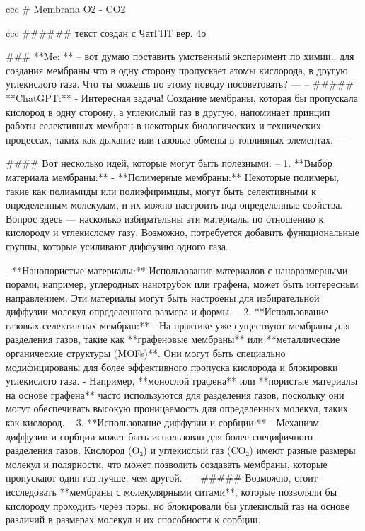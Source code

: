 ccc  #  Membrana O2 - CO2

ccc  ###### текст создан с ЧатГПТ вер. 4о

###  **Me: **  
-- вот думаю поставить умственный эксперимент по химии.. для создания мембраны что в одну сторону пропускает атомы кислорода, в другую углекислого газа. Что ты можешь по этому поводу посоветовать?
--- 
-- ##### **ChatGPT:**  
-  
Интересная задача! Создание мембраны, которая бы пропускала кислород в одну сторону, а углекислый газ в другую, напоминает принцип работы селективных мембран в некоторых биологических и технических процессах, таких как дыхание или газовые обмены в топливных элементах.
- 
-- 
 
#### Вот несколько идей, которые могут быть полезными:
-- 
1. **Выбор материала мембраны:**
   -  **Полимерные мембраны:** Некоторые полимеры, такие как полиамиды или полиэфиримиды, могут быть селективными к определенным молекулам, и их можно настроить под определенные свойства. Вопрос здесь — насколько избирательны эти материалы по отношению к кислороду и углекислому газу. Возможно, потребуется добавить функциональные группы, которые усиливают диффузию одного газа.
   
   -  **Нанопористые материалы:** Использование материалов с наноразмерными порами, например, углеродных нанотрубок или графена, может быть интересным направлением. Эти материалы могут быть настроены для избирательной диффузии молекул определенного размера и формы.
-- 
2. **Использование газовых селективных мембран:**
   - На практике уже существуют мембраны для разделения газов, такие как **графеновые мембраны** или **металлические органические структуры (MOFs)**. Они могут быть специально модифицированы для более эффективного пропуска кислорода и блокировки углекислого газа.
   - Например, **монослой графена** или **пористые материалы на основе графена** часто используются для разделения газов, поскольку они могут обеспечивать высокую проницаемость для определенных молекул, таких как кислород.
-- 
3. **Использование диффузии и сорбции:**
   -  Механизм диффузии и сорбции может быть использован для более специфичного разделения газов. Кислород (O₂) и углекислый газ (CO₂) имеют разные размеры молекул и полярности, что может позволить создавать мембраны, которые пропускают один газ лучше, чем другой.
--   
  -  #####  Возможно, стоит исследовать **мембраны с молекулярными ситами**, которые позволяли бы кислороду проходить через поры, но блокировали бы углекислый газ на основе различий в размерах молекул и их способности к сорбции.

